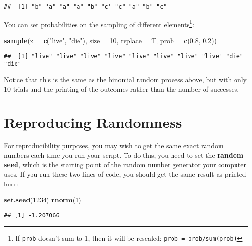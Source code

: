 \documentclass[]{book}
\newenvironment{Shaded}{\begin{snugshade}}{\end{snugshade}}
\newcommand{\KeywordTok}[1]{\textcolor[rgb]{0.13,0.29,0.53}{\textbf{#1}}}
\newcommand{\DataTypeTok}[1]{\textcolor[rgb]{0.13,0.29,0.53}{#1}}
\newcommand{\DecValTok}[1]{\textcolor[rgb]{0.00,0.00,0.81}{#1}}
\newcommand{\FloatTok}[1]{\textcolor[rgb]{0.00,0.00,0.81}{#1}}
\newcommand{\StringTok}[1]{\textcolor[rgb]{0.31,0.60,0.02}{#1}}
\newcommand{\NormalTok}[1]{#1}
\let\rmarkdownfootnote\footnote%
\def\footnote{\protect\rmarkdownfootnote}
\theoremstyle{definition}
\theoremstyle{definition}
\theoremstyle{definition}
\theoremstyle{remark}
\begin{document}
\begin{verbatim}
##  [1] "b" "a" "a" "a" "b" "c" "c" "a" "b" "c"
\end{verbatim}

You can set probabilities on the sampling of different
elements\footnote{If \texttt{prob} doesn't sum to 1, then it will be
  rescaled: \texttt{prob\ =\ prob/sum(prob)}}:

\begin{Shaded}
\begin{Highlighting}[]
\KeywordTok{sample}\NormalTok{(}\DataTypeTok{x =} \KeywordTok{c}\NormalTok{(}\StringTok{"live"}\NormalTok{, }\StringTok{"die"}\NormalTok{), }\DataTypeTok{size =} \DecValTok{10}\NormalTok{, }\DataTypeTok{replace =}\NormalTok{ T,}
       \DataTypeTok{prob =} \KeywordTok{c}\NormalTok{(}\FloatTok{0.8}\NormalTok{, }\FloatTok{0.2}\NormalTok{))}
\end{Highlighting}
\end{Shaded}

\begin{verbatim}
##  [1] "live" "live" "live" "live" "live" "live" "live" "live" "die"  "die"
\end{verbatim}

Notice that this is the same as the binomial random process above, but
with only 10 trials and the printing of the outcomes rather than the
number of successes.

\section{Reproducing Randomness}\label{reproducing-randomness}

For reproducibility purposes, you may wish to get the same exact random
numbers each time you run your script. To do this, you need to set the
\textbf{random seed}, which is the starting point of the random number
generator your computer uses. If you run these two lines of code, you
should get the same result as printed here:

\begin{Shaded}
\begin{Highlighting}[]
\KeywordTok{set.seed}\NormalTok{(}\DecValTok{1234}\NormalTok{)}
\KeywordTok{rnorm}\NormalTok{(}\DecValTok{1}\NormalTok{)}
\end{Highlighting}
\end{Shaded}

\begin{verbatim}
## [1] -1.207066
\end{verbatim}
\end{document}

